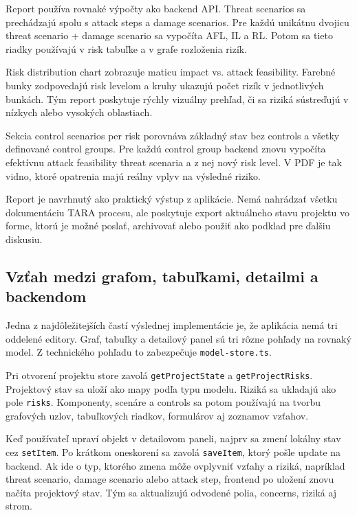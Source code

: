 \documentclass[11pt]{article}
\begin{document}
Report používa rovnaké výpočty ako backend API. Threat scenarios sa prechádzajú spolu s attack steps a damage scenarios. Pre každú unikátnu dvojicu threat scenario + damage scenario sa vypočíta AFL, IL a RL. Potom sa tieto riadky používajú v risk tabuľke a v grafe rozloženia rizík.

Risk distribution chart zobrazuje maticu impact vs. attack feasibility. Farebné bunky zodpovedajú risk levelom a kruhy ukazujú počet rizík v jednotlivých bunkách. Tým report poskytuje rýchly vizuálny prehľad, či sa riziká sústreďujú v nízkych alebo vysokých oblastiach.

Sekcia control scenarios per risk porovnáva základný stav bez controls a všetky definované control groups. Pre každú control group backend znovu vypočíta efektívnu attack feasibility threat scenaria a z nej nový risk level. V PDF je tak vidno, ktoré opatrenia majú reálny vplyv na výsledné riziko.

Report je navrhnutý ako praktický výstup z aplikácie. Nemá nahrádzať všetku dokumentáciu TARA procesu, ale poskytuje export aktuálneho stavu projektu vo forme, ktorú je možné poslať, archivovať alebo použiť ako podklad pre ďalšiu diskusiu.

\subsection{Vzťah medzi grafom, tabuľkami, detailmi a backendom}

Jedna z najdôležitejších častí výslednej implementácie je, že aplikácia nemá tri oddelené editory. Graf, tabuľky a detailový panel sú tri rôzne pohľady na rovnaký model. Z technického pohľadu to zabezpečuje \texttt{model-store.ts}.

Pri otvorení projektu store zavolá \texttt{getProjectState} a \texttt{getProjectRisks}. Projektový stav sa uloží ako mapy podľa typu modelu. Riziká sa ukladajú ako pole \texttt{risks}. Komponenty, scenáre a controls sa potom používajú na tvorbu grafových uzlov, tabuľkových riadkov, formulárov aj zoznamov vzťahov.

Keď používateľ upraví objekt v detailovom paneli, najprv sa zmení lokálny stav cez \texttt{setItem}. Po krátkom oneskorení sa zavolá \texttt{saveItem}, ktorý pošle update na backend. Ak ide o typ, ktorého zmena môže ovplyvniť vzťahy a riziká, napríklad threat scenario, damage scenario alebo attack step, frontend po uložení znovu načíta projektový stav. Tým sa aktualizujú odvodené polia, concerns, riziká aj strom.
\end{document}
